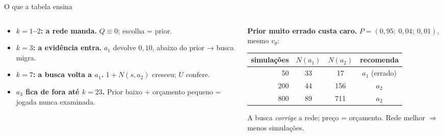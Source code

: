 \documentclass[aspectratio=169, 10pt]{beamer}
\newcommand{\Nvis}{N}
\newcommand{\redeval}{v_{\theta}}
\begin{document}
\begin{frame}{O que a tabela ensina}
  \small
  \begin{columns}[T]
    \begin{column}{0.49\textwidth}
      \begin{itemize}\setlength{\itemsep}{0.35em}
        \item \textbf{$k=1$--$2$: a rede manda.} $Q\equiv 0$; escolha = prior.
        \item \textbf{$k=3$: a evidência entra.} $a_1$ devolve $0{,}10$, abaixo do prior → busca migra.
        \item \textbf{$k=7$: a busca volta a $a_1$.} $1+\Nvis(s,a_2)$ cresceu; $U$ confere.
        \item \textbf{$a_3$ fica de fora até $k=23$.} Prior baixo + orçamento pequeno = jogada nunca examinada.
      \end{itemize}
    \end{column}
    \begin{column}{0.49\textwidth}
      \begin{alertabox}
        \textbf{Prior muito errado custa caro.} $P = (0{,}95;\ 0{,}04;\ 0{,}01)$, mesmo $\redeval$:
        \smallskip
        \begin{center}\scriptsize
        \begin{tabular}{rccc}
          \toprule
          simulações & $\Nvis(a_1)$ & $\Nvis(a_2)$ & recomenda \\
          \midrule
          50  & 33 & 17  & \alert{$a_1$ (errado)} \\
          200 & 44 & 156 & $a_2$ \\
          800 & 89 & 711 & $a_2$ \\
          \bottomrule
        \end{tabular}
        \end{center}
        \smallskip
        A busca \emph{corrige} a rede; preço = orçamento. Rede melhor $\Rightarrow$ menos simulações.
      \end{alertabox}
    \end{column}
  \end{columns}
\end{frame}
\end{document}
